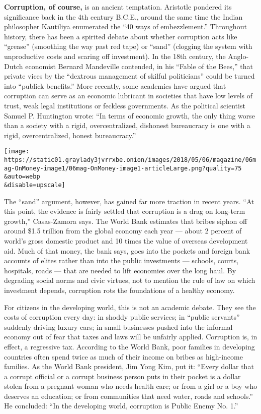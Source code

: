 \textbf{Corruption, of course,} is an ancient temptation. Aristotle
pondered its significance back in the 4th century B.C.E., around the
same time the Indian philosopher Kautiliya enumerated the ``40 ways of
embezzlement.'' Throughout history, there has been a spirited debate
about whether corruption acts like ``grease'' (smoothing the way past
red tape) or ``sand'' (clogging the system with unproductive costs and
scaring off investment). In the 18th century, the Anglo-Dutch economist
Bernard Mandeville contended, in his ``Fable of the Bees,'' that private
vices by the ``dextrous management of skilful politicians'' could be
turned into ``publick benefits.'' More recently, some academics have
argued that corruption can serve as an economic lubricant in societies
that have low levels of trust, weak legal institutions or feckless
governments. As the political scientist Samuel P. Huntington wrote: ``In
terms of economic growth, the only thing worse than a society with a
rigid, overcentralized, dishonest bureaucracy is one with a rigid,
overcentralized, honest bureaucracy.''

\texttt{[image: https://static01.graylady3jvrrxbe.onion/images/2018/05/06/magazine/06mag-OnMoney-image1/06mag-OnMoney-image1-articleLarge.png?quality=75\\\&auto=webp\\\&disable=upscale]}

The ``sand'' argument, however, has gained far more traction in recent
years. ``At this point, the evidence is fairly settled that corruption
is a drag on long-term growth,'' Casas-Zamora says. The World Bank
estimates that bribes siphon off around \$1.5 trillion from the global
economy each year --- about 2 percent of world's gross domestic product
and 10 times the value of overseas development aid. Much of that money,
the bank says, goes into the pockets and foreign bank accounts of elites
rather than into the public investments --- schools, courts, hospitals,
roads --- that are needed to lift economies over the long haul. By
degrading social norms and civic virtues, not to mention the rule of law
on which investment depends, corruption rots the foundations of a
healthy economy.

For citizens in the developing world, this is not an academic debate.
They see the costs of corruption every day: in shoddy public services;
in ``public servants'' suddenly driving luxury cars; in small businesses
pushed into the informal economy out of fear that taxes and laws will be
unfairly applied. Corruption is, in effect, a regressive tax. According
to the World Bank, poor families in developing countries often spend
twice as much of their income on bribes as high-income families. As the
World Bank president, Jim Yong Kim, put it: ``Every dollar that a
corrupt official or a corrupt business person puts in their pocket is a
dollar stolen from a pregnant woman who needs health care; or from a
girl or a boy who deserves an education; or from communities that need
water, roads and schools.'' He concluded: ``In the developing world,
corruption is Public Enemy No. 1.''

